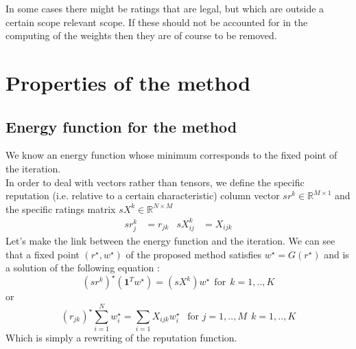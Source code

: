\documentclass[12pt,a4paper]{article}
\begin{document}
In some cases there might be ratings that are legal, but which are outside a certain scope relevant scope. If these should not be accounted for in the computing of the weights then they are of course to be removed.


\section{Properties of the method}
\subsection{Energy function for the method}
We know an energy function whose minimum corresponds to the fixed point of the iteration.\\
In order to deal with vectors rather than tensors, we define the specific reputation (i.e. relative to a certain characteristic) column vector $ sr^k \in \mathbb{R}^{M\times 1}$ and the specific ratings matrix $sX^k \in \mathbb{R}^{N\times M}$
\begin{align*}
sr^k_{j} &= r_{jk} & sX^k_{ij} &= X_{ijk}
\end{align*}
Let's make the link between the energy function and the iteration. 
We can see that a fixed point $(r^{\star},w^{\star})$ of the proposed method satisfies $ w^{\star} = G(r^{\star})$ and is a solution of the following equation :
$$ (sr^k)^{\star} (\mathbf{1}^Tw^{\star}) = (sX^k)w^{\star} \:\:\text{for} \:\: k = 1,..,K$$
or 
$$ (r_{jk})^{\star} \sum_{i=1}^N w_i^{\star} = \sum_{i=1} X_{ijk} w_i^{\star} \:\:\text{ for } j = 1,..,M \:\: k = 1,..,K$$
Which is simply a rewriting of the reputation function.
\end{document}
